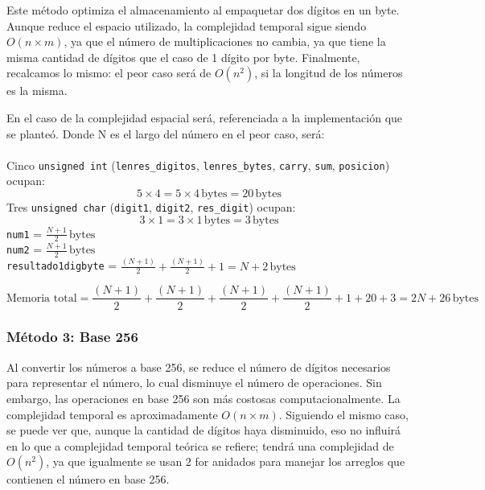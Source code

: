 \documentclass[10pt]{article}
\begin{document}
Este método optimiza el almacenamiento al empaquetar dos dígitos en un byte. Aunque reduce el espacio utilizado, la complejidad temporal sigue siendo $O(n \times m)$, ya que el número de multiplicaciones no cambia, ya que tiene la misma cantidad de dígitos que el caso de 1 dígito por byte. Finalmente, recalcamos lo mismo: el peor caso será de $O(n^2)$, si la longitud de los números es la misma.

En el caso de la complejidad espacial será, referenciada a la implementación que se planteó. Donde N es el largo del número en el peor caso, será:  \\\\
Cinco \texttt{unsigned int} (\texttt{lenres\_digitos}, \texttt{lenres\_bytes}, \texttt{carry}, \texttt{sum}, \texttt{posicion}) ocupan:
\[
5 \times 4 = 5 \times 4 \, \text{bytes} = 20 \, \text{bytes}
\]
Tres \texttt{unsigned char} (\texttt{digit1}, \texttt{digit2}, \texttt{res\_digit}) ocupan:
\[
3 \times 1 = 3 \times 1 \, \text{bytes} = 3 \, \text{bytes}
\]
\texttt{num1} = \(\frac{N + 1}{2}  \, \text{bytes}\) \\
\texttt{num2} = \(\frac{N + 1}{2} \, \text{bytes}\) \\
\texttt{resultado1digbyte} = \(\frac{(N + 1)}{2} + \frac{(N + 1)}{2} + 1 = N + 2 \, \text{bytes}\)

\[
\text{Memoria total} = \frac{(N + 1)}{2} + \frac{(N + 1)}{2} + \frac{(N + 1)}{2} + \frac{(N + 1)}{2} + 1 + 20 + 3 = 2N + 26 \, \text{bytes}
\]

\subsubsection{Método 3: Base 256}

Al convertir los números a base 256, se reduce el número de dígitos necesarios para representar el número, lo cual disminuye el número de operaciones. Sin embargo, las operaciones en base 256 son más costosas computacionalmente. La complejidad temporal es aproximadamente $O(n \times m)$. Siguiendo el mismo caso, se puede ver que, aunque la cantidad de dígitos haya disminuido, eso no influirá en lo que a complejidad temporal teórica se refiere; tendrá una complejidad de $O(n^2)$, ya que igualmente se usan 2 for anidados para manejar los arreglos que contienen el número en base 256.\\
\end{document}
